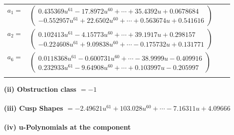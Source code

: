 \documentclass[1p]{elsarticle_modified}
\theoremstyle{definition}
\begin{document}
\begin{tabular}{m{7pt} m{180pt} m{7pt} m{180pt} }
\flushright $a_{1}=$&$\begin{pmatrix}0.435369 u^{61}-17.8972 u^{60}+\cdots+35.4392 u+0.0678684\\-0.552957 u^{61}+22.6502 u^{60}+\cdots+0.563674 u+0.541616\end{pmatrix}$ \\
\flushright $a_{2}=$&$\begin{pmatrix}0.102413 u^{61}-4.15773 u^{60}+\cdots+39.1917 u+0.298157\\-0.224608 u^{61}+9.09838 u^{60}+\cdots-0.175732 u+0.131771\end{pmatrix}$ \\
\flushright $a_{6}=$&$\begin{pmatrix}0.0118368 u^{61}-0.600731 u^{60}+\cdots-38.9999 u-0.409916\\0.232933 u^{61}-9.64908 u^{60}+\cdots+0.103997 u-0.205997\end{pmatrix}$\\&\end{tabular}
\flushleft \textbf{(ii) Obstruction class $= -1$}\\~\\
\flushleft \textbf{(iii) Cusp Shapes $= -2.49621 u^{61}+103.028 u^{60}+\cdots-7.16311 u+4.09666$}\\~\\
\newpage\renewcommand{\arraystretch}{1}
\flushleft \textbf{(iv) u-Polynomials at the component}\newline \\
\end{document}
